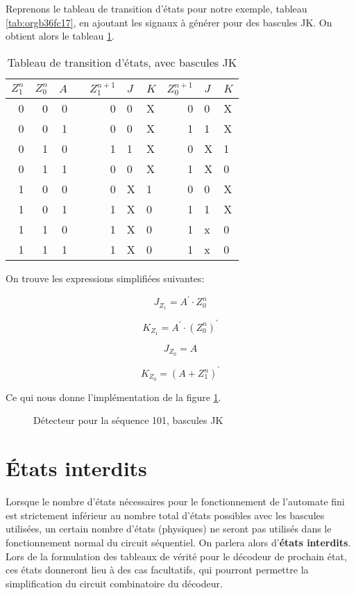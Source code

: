 \documentclass[letter, oneside]{book}
\begin{document}
\begin{enumerate}
Reprenons le tableau de transition d'états pour notre exemple, tableau
\ref{tab:orgb36fc17}, en ajoutant les signaux à générer pour des
bascules JK. On obtient alors le tableau \ref{tab:org5609a0e}.

\begin{table}[htbp]
\caption{\label{tab:org5609a0e}Tableau de transition d'états, avec bascules JK}
\centering
\begin{tabular}{rrrlrllrll}
\(Z_1^n\) & \(Z_0^n\) & \(A\) &  & \(Z_1^{n+1}\) & \(J\) & \(K\) & \(Z_0^{n+1}\) & \(J\) & \(K\)\\[0pt]
\hline
0 & 0 & 0 &  & 0 & 0 & X & 0 & 0 & X\\[0pt]
0 & 0 & 1 &  & 0 & 0 & X & 1 & 1 & X\\[0pt]
0 & 1 & 0 &  & 1 & 1 & X & 0 & X & 1\\[0pt]
0 & 1 & 1 &  & 0 & 0 & X & 1 & X & 0\\[0pt]
1 & 0 & 0 &  & 0 & X & 1 & 0 & 0 & X\\[0pt]
1 & 0 & 1 &  & 1 & X & 0 & 1 & 1 & X\\[0pt]
1 & 1 & 0 &  & 1 & X & 0 & 1 & x & 0\\[0pt]
1 & 1 & 1 &  & 1 & X & 0 & 1 & x & 0\\[0pt]
\end{tabular}
\end{table}

On trouve les expressions simplifiées suivantes:

$$J_{Z_1} = A^\prime \cdot Z_0^n$$

$$K_{Z_1} = A^\prime \cdot (Z_0^n)^\prime$$

$$J_{Z_0} = A$$

$$K_{Z_0} = (A + Z_1^n)^\prime$$

Ce qui nous donne l'implémentation de la figure \ref{fig:orgbe3e9bd}.

\begin{figure}[htbp]
\centering

\caption{\label{fig:orgbe3e9bd}Détecteur pour la séquence 101, bascules JK}
\end{figure}
\end{enumerate}

\section{États interdits}
\label{sec:orgcf6138a}

Lorsque le nombre d'états nécessaires pour le fonctionnement de
l'automate fini est strictement inférieur au nombre total d'états
possibles avec les bascules utilisées, un certain nombre d'états
(physiques) ne seront pas utilisés dans le fonctionnement normal du
circuit séquentiel. On parlera alors d'\textbf{états interdits}.  Lors de la
formulation des tableaux de vérité pour le décodeur de prochain état,
ces états donneront lieu à des cas facultatifs, qui pourront permettre
la simplification du circuit combinatoire du décodeur.
\end{document}

